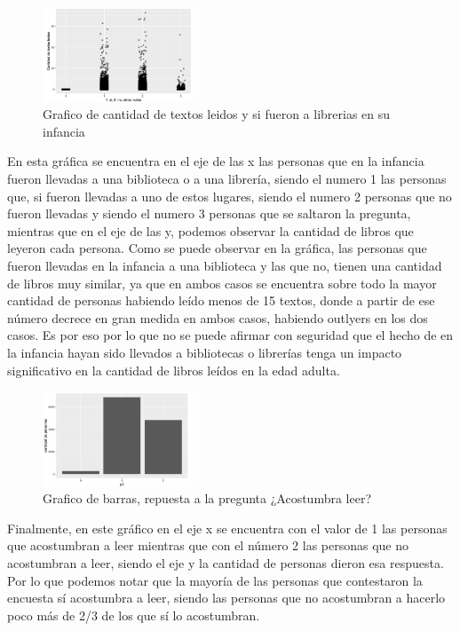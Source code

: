 \documentclass[aps,reprint]{revtex4-2}
\begin{document}
\begin{figure}[H]
    \centering
    \includegraphics[width=0.4\textwidth]{Screenshot 2025-10-10 at 15.25.33.png}
    \caption{Grafico de cantidad de textos leidos y si fueron a librerias en su infancia}
    \label{fig:TL_LI}
    
\end{figure}

En esta gráfica se encuentra en el eje de las x las personas que en la infancia fueron llevadas
a una biblioteca o a una librería, siendo el numero 1 las personas que, si fueron llevadas a
uno de estos lugares, siendo el numero 2 personas que no fueron llevadas y siendo el numero
3 personas que se saltaron la pregunta, mientras que en el eje de las y, podemos observar la
cantidad de libros que leyeron cada persona. Como se puede observar en la gráfica, las
personas que fueron llevadas en la infancia a una biblioteca y las que no, tienen una cantidad
de libros muy similar, ya que en ambos casos se encuentra sobre todo la mayor cantidad de
personas habiendo leído menos de 15 textos, donde a partir de ese número decrece en gran
medida en ambos casos, habiendo outlyers en los dos casos. Es por eso por lo que no se puede
afirmar con seguridad que el hecho de en la infancia hayan sido llevados a bibliotecas o
librerías tenga un impacto significativo en la cantidad de libros leídos en la edad adulta.

\begin{figure}[H]
    \centering
    \includegraphics[width=0.4\textwidth]{Screenshot 2025-10-10 at 15.28.33.png}
    \caption{Grafico de barras, repuesta a la pregunta ¿Acostumbra leer?}
    \label{fig:leer_acostumbra}
    
\end{figure}

Finalmente, en este gráfico en el eje x se encuentra con el valor de 1 las personas que
acostumbran a leer mientras que con el número 2 las personas que no acostumbran a leer,
siendo el eje y la cantidad de personas dieron esa respuesta. Por lo que podemos notar que la
mayoría de las personas que contestaron la encuesta sí acostumbra a leer, siendo las personas
que no acostumbran a hacerlo poco más de 2/3 de los que sí lo acostumbran.
\end{document}
